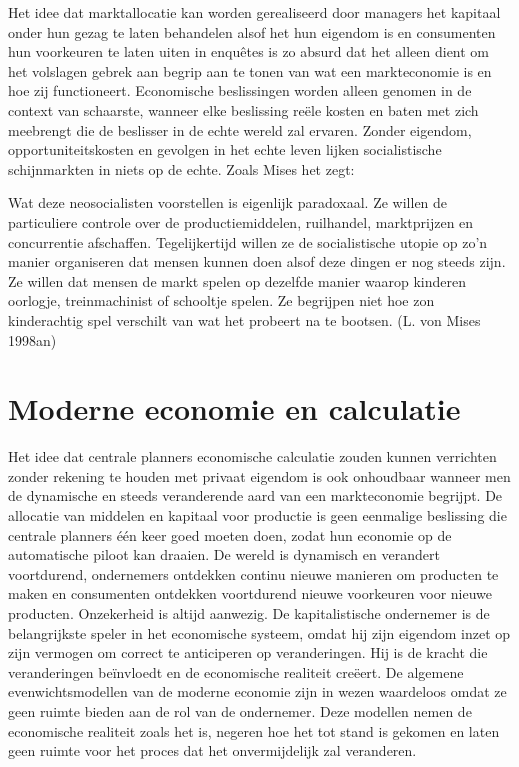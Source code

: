 \documentclass[
  a5paper,
  smalldemyvopaper,11pt,twoside,onecolumn,openright,extrafontsizes,
hidelinks]{memoir}
\begin{document}
Het idee dat marktallocatie kan worden gerealiseerd door managers het
kapitaal onder hun gezag te laten behandelen alsof het hun eigendom is
en consumenten hun voorkeuren te laten uiten in enquêtes is zo absurd
dat het alleen dient om het volslagen gebrek aan begrip aan te tonen van
wat een markteconomie is en hoe zij functioneert. Economische
beslissingen worden alleen genomen in de context van schaarste, wanneer
elke beslissing reële kosten en baten met zich meebrengt die de
beslisser in de echte wereld zal ervaren. Zonder eigendom,
opportuniteitskosten en gevolgen in het echte leven lijken
socialistische schijnmarkten in niets op de echte. Zoals Mises het zegt:

Wat deze neosocialisten voorstellen is eigenlijk paradoxaal. Ze willen
de particuliere controle over de productiemiddelen, ruilhandel,
marktprijzen en concurrentie afschaffen. Tegelijkertijd willen ze de
socialistische utopie op zo'n manier organiseren dat mensen kunnen doen
alsof deze dingen er nog steeds zijn. Ze willen dat mensen de markt
spelen op dezelfde manier waarop kinderen oorlogje, treinmachinist of
schooltje spelen. Ze begrijpen niet hoe zon kinderachtig spel verschilt
van wat het probeert na te bootsen. (L. von Mises 1998an)

\section{Moderne economie en
calculatie}\label{moderne-economie-en-calculatie}

Het idee dat centrale planners economische calculatie zouden kunnen
verrichten zonder rekening te houden met privaat eigendom is ook
onhoudbaar wanneer men de dynamische en steeds veranderende aard van een
markteconomie begrijpt. De allocatie van middelen en kapitaal voor
productie is geen eenmalige beslissing die centrale planners één keer
goed moeten doen, zodat hun economie op de automatische piloot kan
draaien. De wereld is dynamisch en verandert voortdurend, ondernemers
ontdekken continu nieuwe manieren om producten te maken en consumenten
ontdekken voortdurend nieuwe voorkeuren voor nieuwe producten.
Onzekerheid is altijd aanwezig. De kapitalistische ondernemer is de
belangrijkste speler in het economische systeem, omdat hij zijn eigendom
inzet op zijn vermogen om correct te anticiperen op veranderingen. Hij
is de kracht die veranderingen beïnvloedt en de economische realiteit
creëert. De algemene evenwichtsmodellen van de moderne economie zijn in
wezen waardeloos omdat ze geen ruimte bieden aan de rol van de
ondernemer. Deze modellen nemen de economische realiteit zoals het is,
negeren hoe het tot stand is gekomen en laten geen ruimte voor het
proces dat het onvermijdelijk zal veranderen.
\end{document}
